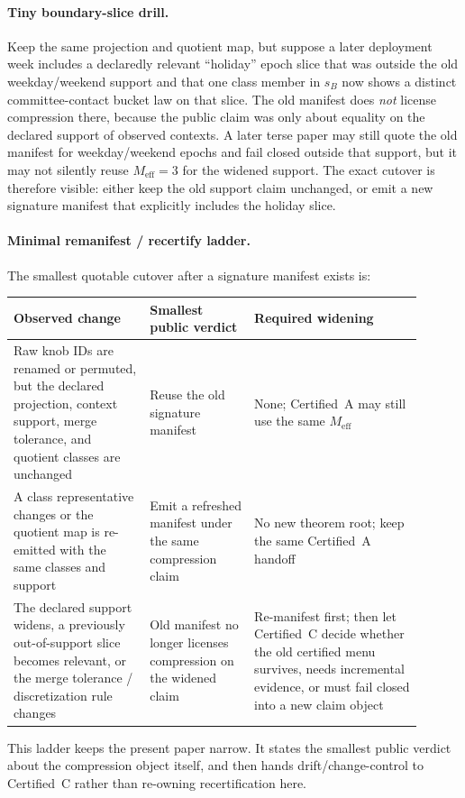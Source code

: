 \documentclass[11pt]{article}
\begin{document}
\paragraph{Tiny boundary-slice drill.}
Keep the same projection and quotient map, but suppose a later deployment week includes a declaredly relevant ``holiday'' epoch slice that was outside the old weekday/weekend support and that one class member in $s_B$ now shows a distinct committee-contact bucket law on that slice.
The old manifest does \emph{not} license compression there, because the public claim was only about equality on the declared support of observed contexts.
A later terse paper may still quote the old manifest for weekday/weekend epochs and fail closed outside that support, but it may not silently reuse $M_{\mathrm{eff}}=3$ for the widened support.
The exact cutover is therefore visible: either keep the old support claim unchanged, or emit a new signature manifest that explicitly includes the holiday slice.

\paragraph{Minimal remanifest / recertify ladder.}
The smallest quotable cutover after a signature manifest exists is:
\begin{center}\small
\begin{tabular}{@{}p{0.30\linewidth}p{0.23\linewidth}p{0.37\linewidth}@{}}
\toprule
Observed change & Smallest public verdict & Required widening \\
\midrule
Raw knob IDs are renamed or permuted, but the declared projection, context support, merge tolerance, and quotient classes are unchanged & Reuse the old signature manifest & None; Certified~A may still use the same $M_{\mathrm{eff}}$ \\
A class representative changes or the quotient map is re-emitted with the same classes and support & Emit a refreshed manifest under the same compression claim & No new theorem root; keep the same Certified~A handoff \\
The declared support widens, a previously out-of-support slice becomes relevant, or the merge tolerance / discretization rule changes & Old manifest no longer licenses compression on the widened claim & Re-manifest first; then let Certified~C decide whether the old certified menu survives, needs incremental evidence, or must fail closed into a new claim object \\
\bottomrule
\end{tabular}
\end{center}
This ladder keeps the present paper narrow.
It states the smallest public verdict about the compression object itself, and then hands drift/change-control to Certified~C rather than re-owning recertification here.\cite{series:recert}
\end{document}

